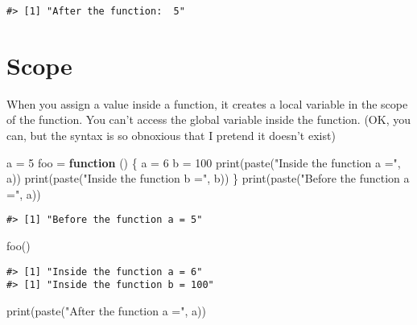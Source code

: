 \documentclass[
]{book}
\newenvironment{Shaded}{\begin{snugshade}}{\end{snugshade}}
\newcommand{\ControlFlowTok}[1]{\textcolor[rgb]{0.13,0.29,0.53}{\textbf{#1}}}
\newcommand{\DecValTok}[1]{\textcolor[rgb]{0.00,0.00,0.81}{#1}}
\newcommand{\FunctionTok}[1]{\textcolor[rgb]{0.00,0.00,0.00}{#1}}
\newcommand{\NormalTok}[1]{#1}
\newcommand{\OtherTok}[1]{\textcolor[rgb]{0.56,0.35,0.01}{#1}}
\newcommand{\StringTok}[1]{\textcolor[rgb]{0.31,0.60,0.02}{#1}}
\begin{document}
\begin{verbatim}
#> [1] "After the function:  5"
\end{verbatim}

\hypertarget{scope}{%
\section{Scope}\label{scope}}

When you assign a value inside a function, it creates a local variable in the scope of the function. You can't access the global variable inside the function. (OK, you can, but the syntax is so obnoxious that I pretend it doesn't exist)

\begin{Shaded}
\begin{Highlighting}[]
\NormalTok{a }\OtherTok{=} \DecValTok{5}
\NormalTok{foo }\OtherTok{=} \ControlFlowTok{function}\NormalTok{ () \{}
\NormalTok{  a }\OtherTok{=} \DecValTok{6}
\NormalTok{  b }\OtherTok{=} \DecValTok{100}
  \FunctionTok{print}\NormalTok{(}\FunctionTok{paste}\NormalTok{(}\StringTok{"Inside the function a ="}\NormalTok{, a))}
  \FunctionTok{print}\NormalTok{(}\FunctionTok{paste}\NormalTok{(}\StringTok{"Inside the function b ="}\NormalTok{, b))}
\NormalTok{\}}
\FunctionTok{print}\NormalTok{(}\FunctionTok{paste}\NormalTok{(}\StringTok{"Before the function a ="}\NormalTok{, a))}
\end{Highlighting}
\end{Shaded}

\begin{verbatim}
#> [1] "Before the function a = 5"
\end{verbatim}

\begin{Shaded}
\begin{Highlighting}[]
\FunctionTok{foo}\NormalTok{()}
\end{Highlighting}
\end{Shaded}

\begin{verbatim}
#> [1] "Inside the function a = 6"
#> [1] "Inside the function b = 100"
\end{verbatim}

\begin{Shaded}
\begin{Highlighting}[]
\FunctionTok{print}\NormalTok{(}\FunctionTok{paste}\NormalTok{(}\StringTok{"After the function a ="}\NormalTok{, a))}
\end{Highlighting}
\end{Shaded}
\end{document}
